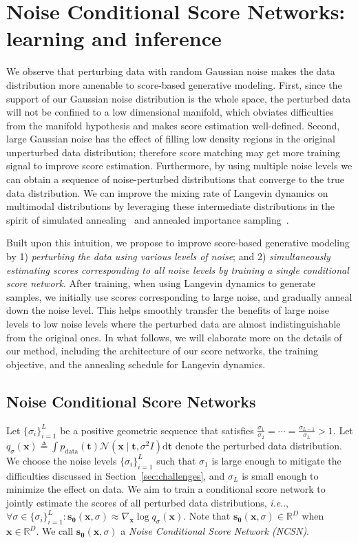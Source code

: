 \documentclass{article}
\makeatletter
\newcommand{\mbf}[1]{\mathbf{#1}}
\newcommand{\mbb}[1]{\mathbb{#1}}
\newcommand{\ud}{\mathrm{d}}
\newcommand{\mcal}{\mathcal}
\def\@onedot{\ifx\@let@token.\else.\null\fi\xspace}
\DeclareRobustCommand\onedot{\futurelet\@let@token\@onedot}
\newcommand{\secref}[1]{Section~\ref{#1}}
\newcommand{\bfx}{\mathbf{x}}
\newcommand{\bftheta}{{\boldsymbol{\theta}}}
\newcommand{\bfs}{\mathbf{s}}
\def\ie{\emph{i.e}\onedot}
\makeatother
\begin{document}
 \section{Noise Conditional Score Networks: learning and inference}
We observe that perturbing data with random Gaussian noise makes the data distribution more amenable to score-based generative modeling. First, since the support of our Gaussian noise distribution is the whole space, the perturbed data will not be confined to a low dimensional manifold, which obviates difficulties from the manifold hypothesis and makes score estimation well-defined. Second, large Gaussian noise has the effect of filling low density regions in the original unperturbed data distribution; therefore score matching may get more training signal to improve score estimation. Furthermore, by using multiple noise levels we can obtain a sequence of noise-perturbed distributions that converge to the true data distribution. We can improve the mixing rate of Langevin dynamics on multimodal distributions by leveraging these intermediate distributions in the spirit of simulated annealing~\cite{kirkpatrick83optimizationby} and annealed importance sampling~\cite{neal2001annealed}.

Built upon this intuition, we propose to improve score-based generative modeling by 1) \emph{perturbing the data using various levels of noise}; and 2) \emph{simultaneously estimating scores corresponding to all noise levels by training a single conditional score network}. After training, when using Langevin dynamics to generate samples, we initially use scores corresponding to 
large noise, and gradually anneal down the noise level. This helps smoothly transfer the benefits of large noise levels to low noise levels where the perturbed data are almost indistinguishable from the original ones. In what follows, we will elaborate more on the details of our method, including the architecture of our score networks, the training objective, and the annealing schedule for Langevin dynamics.



\subsection{Noise Conditional Score Networks}
Let $\{\sigma_i\}_{i=1}^L$ be a positive geometric sequence that satisfies $\frac{\sigma_1}{\sigma_2} =\cdots = \frac{\sigma_{L-1}}{\sigma_L} > 1$. Let $q_\sigma(\bfx) \triangleq \int p_\text{data}(\mbf{t}) \mcal{N}(\bfx \mid \mbf{t}, \sigma^2 I)\ud \mbf{t}$ denote the perturbed data distribution. We choose the noise levels $\{\sigma_i\}_{i=1}^L$ such that $\sigma_1$ is large enough to mitigate the difficulties discussed in \secref{sec:challenges}, and $\sigma_L$ is small enough to minimize the effect on data. We aim to train a conditional score network to jointly estimate the scores of all perturbed data distributions, \ie, $\forall \sigma \in \{\sigma_i\}_{i=1}^L: \bfs_\bftheta(\bfx, \sigma) \approx \nabla_\bfx \log q_\sigma(\bfx)$. Note that $\bfs_\bftheta(\bfx, \sigma) \in \mbb{R}^D$ when $\bfx \in \mbb{R}^D$. We call $\bfs_\bftheta(\bfx, \sigma)$ a \textit{Noise Conditional Score Network (NCSN)}.
\end{document}
